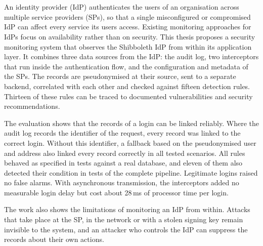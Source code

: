 \documentclass[../main.tex]{subfiles}
\begin{document}
\chapter*{\myAbstractTitle}

An identity provider (IdP) authenticates the users of an organisation across multiple service 
providers (SPs), so that a single misconfigured or compromised IdP can affect every service its 
users access. 
Existing monitoring approaches for IdPs focus on availability rather than on security. 
This thesis proposes a security monitoring system that observes the Shibboleth IdP from within its 
application layer. 
It combines three data sources from the IdP: the audit log, two interceptors that run 
inside the authentication flow, and the configuration and metadata of the SPs. 
The records are pseudonymised at their source, sent to a separate backend, correlated with each 
other and checked against fifteen detection rules. 
Thirteen of these rules can be traced to documented vulnerabilities and security recommendations. 

The evaluation shows that the records of a login can be linked reliably. 
Where the audit log records the identifier of the request, every record was linked to the correct 
login. 
Without this identifier, a fallback based on the pseudonymised user and address also linked every 
record correctly in all tested scenarios. 
All rules behaved as specified in tests against a real database, and eleven of them also detected 
their condition in tests of the complete pipeline. 
Legitimate logins raised no false alarms. 
With asynchronous transmission, the interceptors added no measurable login delay but cost about 
28\,ms of processor time per login.

The work also shows the limitations of monitoring an IdP from within. 
Attacks that take place at the SP, in the network or with a stolen signing key remain invisible to 
the system, and an attacker who controls the IdP can suppress the records about their own actions. 
\end{document}
